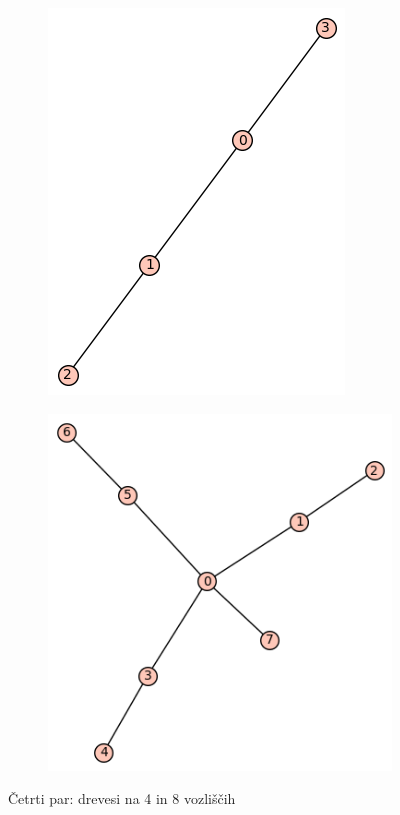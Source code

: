 \documentclass[12pt, a4paper]{article}
\begin{document}
\begin{center}
\begin{center}
\begin{figure}[!htb]
\centering
\begin{subfigure}{0.5\textwidth}
  \centering
  \includegraphics[width=0.4\linewidth]{t-3}
\end{subfigure}%
\begin{subfigure}{0.5\textwidth}
  \centering
  \includegraphics[width=0.5\linewidth]{t-44}
\end{subfigure}
\caption{Četrti par: drevesi na 4 in 8 vozliščih}
\label{fig:test}
\end{figure}
\end{center}


\end{center}
\end{document}
